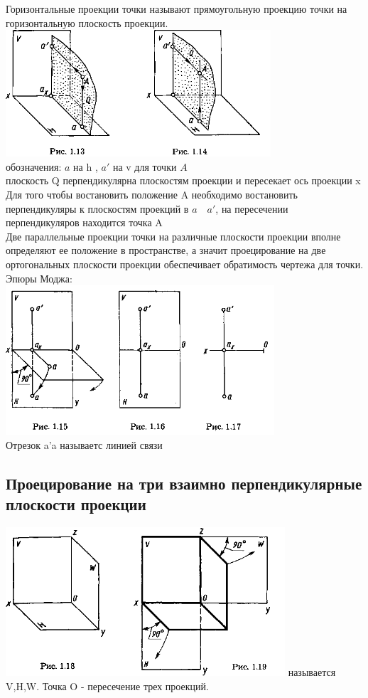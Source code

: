 \documentclass[a4paper, 12pt]{article}
\begin{document}
Горизонтальные проекции точки называют прямоугольную проекцию точки на горизонтальную плоскость проекции.\\
\includegraphics{eng141}\\
обозначения: $ a $ на h , $ a' $ на v для точки $ A $\\
плоскость Q перпендикулярна плоскостям проекции и пересекает ось проекции x\\
Для того чтобы востановить положение A необходимо востановить перпендикуляры к плоскостям проекций в $a \quad a'$, на пересечении перпендикуляров находится точка A\\
Две параллельные проекции точки на различные плоскости проекции вполне определяют ее положение в пространстве, а значит проецирование на две ортогональных плоскости проекции обеспечивает обратимость чертежа для точки.\\

Эпюры Моджа:\\
\includegraphics{142}\\
Отрезок a'a называетс линией связи\\

\subsection{Проецирование на три взаимно перпендикулярные плоскости проекции}

\includegraphics{151}
называется V,H,W. Точка O - пересечение трех проекций.\\
\end{document}
